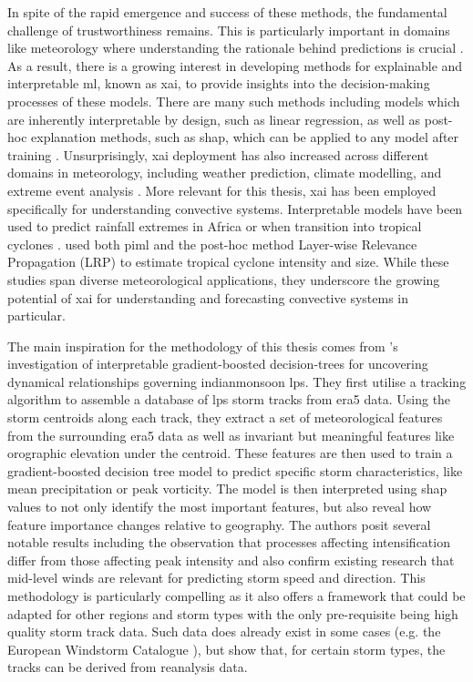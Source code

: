 In spite of the rapid emergence and success of these methods, the fundamental challenge of trustworthiness remains. This is particularly important in domains like meteorology where understanding the rationale behind predictions is crucial \citep{BarredoArrieta2019,Zhang2025}. As a result, there is a growing interest in developing methods for explainable and interpretable \acrshort{ml}, known as \acrfull{xai}, to provide insights into the decision-making processes of these models. There are many such methods including models which are inherently interpretable by design, such as linear regression, as well as post-hoc explanation methods, such as \acrfull{shap}, which can be applied to any model after training \citep{BarredoArrieta2019,Molnar2025}. Unsurprisingly, \acrshort{xai} deployment has also increased across different domains in meteorology, including weather prediction, climate modelling, and extreme event analysis \citep{Mamalakis2022,Yang2024}. More relevant for this thesis, \acrshort{xai} has been employed specifically for understanding convective systems. Interpretable models have been used to predict rainfall extremes in Africa or when  transition into tropical cyclones \citep{Bassine2025,Zhang2019}. \cite{Zhuo2021} used both \acrshort{piml} and the post-hoc method Layer-wise Relevance Propagation (LRP) to estimate tropical cyclone intensity and size. While these studies span diverse meteorological applications, they underscore the growing potential of \acrshort{xai} for understanding and forecasting convective systems in particular.

The main inspiration for the methodology of this thesis comes from \cite{Hunt2024}'s investigation of interpretable gradient-boosted decision-trees for uncovering dynamical relationships governing \gls{indianmonsoon} \acrfull{lps}. They first utilise a tracking algorithm to assemble a database of \acrshort{lps} storm tracks from \acrshort{era5} data. Using the storm centroids along each track, they extract a set of meteorological features from the surrounding \acrshort{era5} data as well as invariant but meaningful features like orographic elevation under the centroid. These features are then used to train a gradient-boosted decision tree model to predict specific storm characteristics, like mean precipitation or peak vorticity. The model is then interpreted using \acrshort{shap} values to not only identify the most important features, but also reveal how feature importance changes relative to geography. The authors posit several notable results including the observation that processes affecting intensification differ from those affecting peak intensity and also confirm existing research that mid-level winds are relevant for predicting storm speed and direction. This methodology is particularly compelling as it also offers a framework that could be adapted for other regions and storm types with the only pre-requisite being high quality storm track data. Such data does already exist in some cases (e.g. the European Windstorm Catalogue \citep{Roberts2014}), but \cite{Hunt2024} show that, for certain storm types, the tracks can be derived from reanalysis data.

